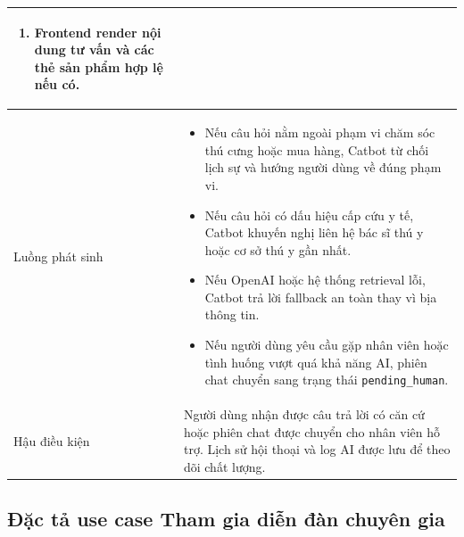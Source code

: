 \documentclass[../DoAn.tex]{subfiles}
\begin{document}
{\begin{longtable}{|p{3.2cm}|p{10.4cm}|}
\begin{minipage}[t]{10.1cm}
\begin{enumerate}[leftmargin=*,topsep=0pt,itemsep=0pt]
    \item Frontend render nội dung tư vấn và các thẻ sản phẩm hợp lệ nếu có.
\end{enumerate}
\end{minipage} \\ \hline
Luồng phát sinh &
\begin{minipage}[t]{10.1cm}
\begin{itemize}[leftmargin=*,topsep=0pt,itemsep=0pt]
    \item Nếu câu hỏi nằm ngoài phạm vi chăm sóc thú cưng hoặc mua hàng, Catbot từ chối lịch sự và hướng người dùng về đúng phạm vi.
    \item Nếu câu hỏi có dấu hiệu cấp cứu y tế, Catbot khuyến nghị liên hệ bác sĩ thú y hoặc cơ sở thú y gần nhất.
    \item Nếu OpenAI hoặc hệ thống retrieval lỗi, Catbot trả lời fallback an toàn thay vì bịa thông tin.
    \item Nếu người dùng yêu cầu gặp nhân viên hoặc tình huống vượt quá khả năng AI, phiên chat chuyển sang trạng thái \texttt{pending\_human}.
\end{itemize}
\end{minipage} \\ \hline
Hậu điều kiện & Người dùng nhận được câu trả lời có căn cứ hoặc phiên chat được chuyển cho nhân viên hỗ trợ. Lịch sử hội thoại và log AI được lưu để theo dõi chất lượng. \\ \hline
\end{longtable}
}

\subsection{Đặc tả use case Tham gia diễn đàn chuyên gia}
\label{subsection:2.3.7}
\end{document}
